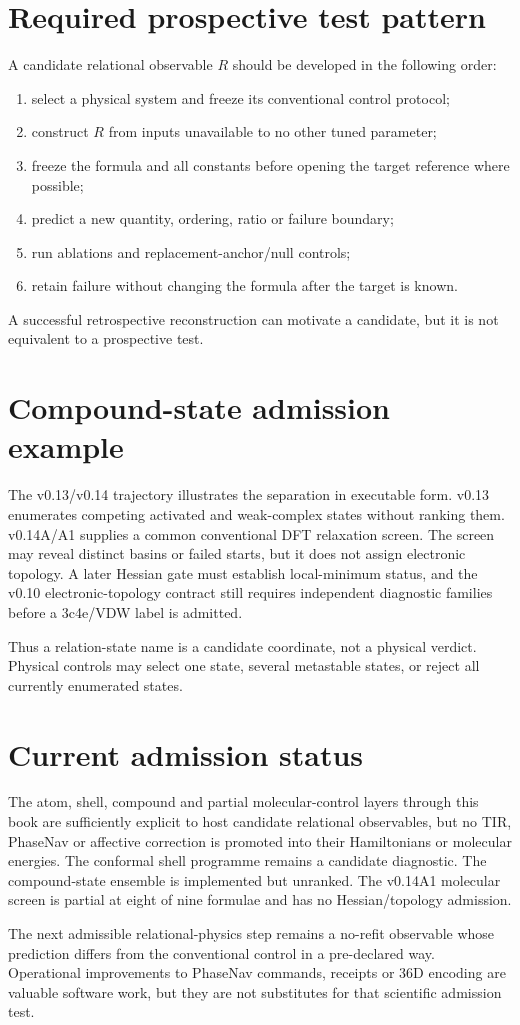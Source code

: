 \section{Required prospective test pattern}
A candidate relational observable $R$ should be developed in the following order:
\begin{enumerate}
\item select a physical system and freeze its conventional control protocol;
\item construct $R$ from inputs unavailable to no other tuned parameter;
\item freeze the formula and all constants before opening the target reference where possible;
\item predict a new quantity, ordering, ratio or failure boundary;
\item run ablations and replacement-anchor/null controls;
\item retain failure without changing the formula after the target is known.
\end{enumerate}
A successful retrospective reconstruction can motivate a candidate, but it is not equivalent to a prospective test.

\section{Compound-state admission example}
The v0.13/v0.14 trajectory illustrates the separation in executable form.  v0.13 enumerates competing activated and weak-complex states without ranking them.  v0.14A/A1 supplies a common conventional DFT relaxation screen.  The screen may reveal distinct basins or failed starts, but it does not assign electronic topology.  A later Hessian gate must establish local-minimum status, and the v0.10 electronic-topology contract still requires independent diagnostic families before a 3c4e/VDW label is admitted.

Thus a relation-state name is a candidate coordinate, not a physical verdict.  Physical controls may select one state, several metastable states, or reject all currently enumerated states.

\section{Current admission status}
The atom, shell, compound and partial molecular-control layers through this book are sufficiently explicit to host candidate relational observables, but no TIR, PhaseNav or affective correction is promoted into their Hamiltonians or molecular energies.  The conformal shell programme remains a candidate diagnostic.  The compound-state ensemble is implemented but unranked.  The v0.14A1 molecular screen is partial at eight of nine formulae and has no Hessian/topology admission.

The next admissible relational-physics step remains a no-refit observable whose prediction differs from the conventional control in a pre-declared way.  Operational improvements to PhaseNav commands, receipts or 36D encoding are valuable software work, but they are not substitutes for that scientific admission test.
